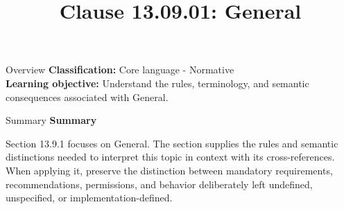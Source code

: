 \documentclass[10pt,letterpaper]{article}
\title{Clause 13.09.01: General}
\author{}
\date{}
\begin{document}
\maketitle
\begin{CornellOverviewBox}{Overview}
\textbf{Classification:} Core language - Normative\\[2pt]
\textbf{Learning objective:} Understand the rules, terminology, and semantic consequences associated with General.
\end{CornellOverviewBox}\begin{CornellSummaryBox}{Summary}
{\sffamily\bfseries\color{Accent} Summary}\par\vspace{3pt}Section 13.9.1 focuses on General. The section supplies the rules and semantic distinctions needed to interpret this topic in context with its cross-references. When applying it, preserve the distinction between mandatory requirements, recommendations, permissions, and behavior deliberately left undefined, unspecified, or implementation-defined.
\end{CornellSummaryBox}
\end{document}
